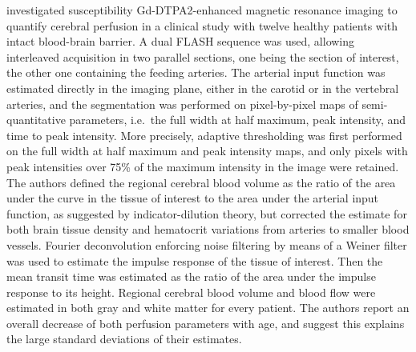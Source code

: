 \citet{Rempp:1994kk} investigated susceptibility Gd-DTPA2-enhanced magnetic resonance imaging to quantify cerebral perfusion in a clinical study with twelve healthy patients with intact blood-brain barrier.
A dual FLASH sequence was used, allowing interleaved acquisition in two parallel sections, one being the section of interest, the other one containing the feeding arteries.
The arterial input function was estimated directly in the imaging plane, either in the carotid or in the vertebral arteries, and the segmentation was performed on pixel-by-pixel maps of semi-quantitative parameters, i.e.~the full width at half maximum, peak intensity, and time to peak intensity.
More precisely, adaptive thresholding was first performed on the full width at half maximum and peak intensity maps, and only pixels with peak intensities over 75\% of the maximum intensity in the image were retained.
The authors defined the regional cerebral blood volume as the ratio of the area under the curve in the tissue of interest to the area under the arterial input function, as suggested by indicator-dilution theory, but corrected the estimate for both brain tissue density and hematocrit variations from arteries to smaller blood vessels.
Fourier deconvolution enforcing noise filtering by means of a Weiner filter was used to estimate the impulse response of the tissue of interest.
Then the mean transit time was estimated as the ratio of the area under the impulse response to its height.
Regional cerebral blood volume and blood flow were estimated in both gray and white matter for every patient.
The authors report an overall decrease of both perfusion parameters with age, and suggest this explains the large standard deviations of their estimates.

